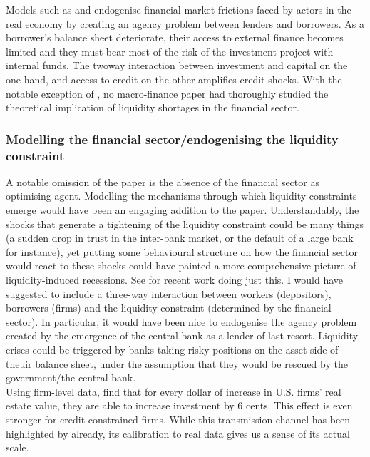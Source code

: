 \documentclass{amsart}
\theoremstyle{definition}
\theoremstyle{remark}
\numberwithin{equation}{section}
\begin{document}
Models such as \cite{bernanke1989agency} and \cite{kiyotaki1997credit} endogenise financial market frictions faced by actors in the real economy by creating an agency problem between lenders and borrowers. As a borrower's balance sheet deteriorate, their access to external finance becomes limited and they must bear most of the risk of the investment project with internal funds. The twoway interaction between investment and capital on the one hand, and access to credit on the other amplifies credit shocks. With the notable exception of \cite{holmstrom1997financial}, no macro-finance paper had thoroughly studied the theoretical implication of liquidity shortages in the financial sector. \\

\subsubsection*{Modelling the financial sector/endogenising the liquidity constraint} A notable omission of the paper is the absence of the financial sector as optimising agent. Modelling the mechanisms through which liquidity constraints emerge would have been an engaging addition to the paper. Understandably, the shocks that generate a tightening of the liquidity constraint could be many things (a sudden drop in trust in the inter-bank market, or the default of a large bank for instance), yet putting some behavioural structure on how the financial sector would react to these shocks could have painted a more comprehensive picture of liquidity-induced recessions. See \cite{he2013intermediary, angeloni2013capital, gertler2010financial} for recent work doing just this. I would have suggested to include a three-way interaction between workers (depositors), borrowers (firms) and the liquidity constraint (determined by the financial sector). In particular, it would have been nice to endogenise the agency problem created by the emergence of the central bank as a lender of last resort. Liquidity crises could be triggered by banks taking risky positions on the asset side of theuir balance sheet, under the assumption that they would be rescued by the government/the central bank.\\     

Using firm-level data, \cite{chaney2012collateral} find that for every dollar of increase in U.S. firms' real estate value, they are able to increase investment by 6 cents. This effect is even stronger for credit constrained firms. While this transmission channel has been highlighted by \cite{kiyotaki1997credit} already, its calibration to real data gives us a sense of its actual scale. \\
\end{document}
